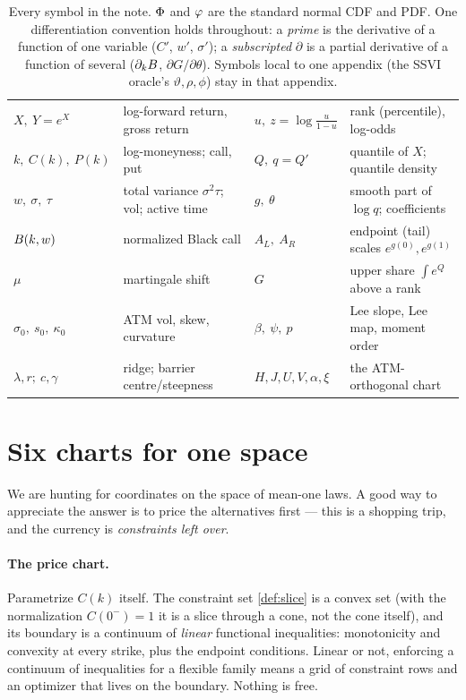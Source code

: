 \documentclass[11pt]{article}
\begin{document}
\begin{table}[H]
\centering\footnotesize
\setlength{\tabcolsep}{4pt}
\begin{tabular}{@{}llll@{}}
\toprule
$X,\ Y=e^{X}$ & log-forward return, gross return &
$u,\ z=\log\frac{u}{1-u}$ & rank (percentile), log-odds\\[2pt]
$k,\ C(k),\ P(k)$ & log-moneyness; call, put &
$Q,\ q=Q'$ & quantile of $X$; quantile density\\[2pt]
$w,\ \sigma,\ \tau$ & total variance $\sigma^{2}\tau$; vol; active time &
$g,\ \theta$ & smooth part of $\log q$; coefficients\\[2pt]
$B(k,w)$ & normalized Black call &
$A_L,\ A_R$ & endpoint (tail) scales $e^{g(0)},e^{g(1)}$\\[2pt]
$\mu$ & martingale shift &
$G$ & upper share $\int e^{Q}$ above a rank\\[2pt]
$\sigma_0,\ s_0,\ \kappa_0$ & ATM vol, skew, curvature &
$\beta,\ \psi,\ p$ & Lee slope, Lee map, moment order\\[2pt]
$\lambda,r;\ c,\gamma$ & ridge; barrier centre/steepness &
$H,J,U,V,\alpha,\xi$ & the ATM-orthogonal chart\\
\bottomrule
\end{tabular}
\caption{Every symbol in the note.  $\Phi$ and $\varphi$ are the standard
normal CDF and PDF.  One differentiation convention holds throughout: a
\emph{prime} is the derivative of a function of one variable ($C'$, $w'$,
$\sigma'$); a \emph{subscripted} $\partial$ is a partial derivative of a
function of several ($\partial_kB$, $\partial G/\partial\theta$).
Symbols local to one appendix (the SSVI oracle's $\vartheta,\rho,\phi$) stay
in that appendix.}
\label{tab:ledger}
\end{table}

\section{Six charts for one space}
\label{sec:charts}

We are hunting for coordinates on the space of mean-one laws.  A good way to
appreciate the answer is to price the alternatives first --- this is a
shopping trip, and the currency is \emph{constraints left over}.

\paragraph{The price chart.}  Parametrize $C(k)$ itself.  The constraint set
\cref{def:slice} is a convex set (with the normalization $C(0^-)=1$ it is a
slice through a cone, not the cone itself), and its boundary is a continuum
of \emph{linear} functional inequalities: monotonicity and convexity at
every strike, plus the endpoint conditions.  Linear or not, enforcing a
continuum of inequalities for a flexible family means a grid of constraint
rows and an optimizer that lives on the boundary.  Nothing is free.
\end{document}
